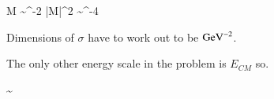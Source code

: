 {\be
M \sim \GeV^{-2} \Rightarrow |M|^2 \sim \GeV^{-4}
\ee

Dimensions of $\sigma$ have to work out to be $\textrm{GeV}^{-2}$.

The only other energy scale in the problem is $E_{CM}$ so.

\be
\sigma \sim {}
\ee




\ei





\clearpage



} %

